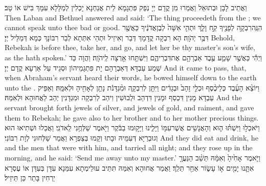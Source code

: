 {וַאֲתֵיב לָבָן וּבְתוּאֵל וַאֲמַרוּ מִן קֳדָם יְיָ נְפַק פִּתְגָמָא לֵית אֲנַחְנָא יָכְלִין לְמַלָּלָא עִמָּךְ בִּישׁ אוֹ טָב׃}
{Then Laban and Bethuel answered and said: ‘The thing proceedeth from the \lord; we cannot speak unto thee bad or good.}{}
{הִנֵּֽה\maqqaf רִבְקָ֥ה לְפָנֶ֖יךָ קַ֣ח וָלֵ֑ךְ וּתְהִ֤י אִשָּׁה֙ לְבֶן\maqqaf אֲדֹנֶ֔יךָ כַּאֲשֶׁ֖ר דִּבֶּ֥ר יְהֹוָֽה׃}
{הָא רִבְקָה קֳדָמָךְ דְּבַר וְאִיזֵיל וּתְהֵי אִתְּתָא לְבַר רִבּוֹנָךְ כְּמָא דְּמַלֵּיל יְיָ׃}
{Behold, Rebekah is before thee, take her, and go, and let her be thy master’s son’s wife, as the \lord\space hath spoken.’}{}
{וַיְהִ֕י כַּאֲשֶׁ֥ר שָׁמַ֛ע עֶ֥בֶד אַבְרָהָ֖ם אֶת\maqqaf דִּבְרֵיהֶ֑ם וַיִּשְׁתַּ֥חוּ אַ֖רְצָה לַֽיהֹוָֽה׃}
{וַהֲוָה כַּד שְׁמַע עַבְדָּא דְּאַבְרָהָם יָת פִּתְגָמֵיהוֹן וּסְגֵיד עַל אַרְעָא קֳדָם יְיָ׃}
{And it came to pass, that, when Abraham’s servant heard their words, he bowed himself down to the earth unto the \lord.}{}
{וַיּוֹצֵ֨א הָעֶ֜בֶד כְּלֵי\maqqaf כֶ֨סֶף וּכְלֵ֤י זָהָב֙ וּבְגָדִ֔ים וַיִּתֵּ֖ן לְרִבְקָ֑ה וּמִ֨גְדָּנֹ֔ת נָתַ֥ן לְאָחִ֖יהָ וּלְאִמָּֽהּ׃}
{וְאַפֵּיק עַבְדָּא מָנִין דִּכְסַף וּמָנִין דִּדְהַב וּלְבוּשִׁין וִיהַב לְרִבְקָה וּמִגְדָּנִין יְהַב לַאֲחוּהָא וּלְאִמַּהּ׃}
{And the servant brought forth jewels of silver, and jewels of gold, and raiment, and gave them to Rebekah; he gave also to her brother and to her mother precious things.}{}
{וַיֹּאכְל֣וּ וַיִּשְׁתּ֗וּ ה֛וּא וְהָאֲנָשִׁ֥ים אֲשֶׁר\maqqaf עִמּ֖וֹ וַיָּלִ֑ינוּ וַיָּק֣וּמוּ בַבֹּ֔קֶר וַיֹּ֖אמֶר שַׁלְּחֻ֥נִי לַֽאדֹנִֽי׃}
{וַאֲכַלוּ וּשְׁתִיאוּ הוּא וְגוּבְרַיָּא דְּעִמֵּיהּ וּבָתוּ וְקָמוּ בְּצַפְרָא וַאֲמַר שַׁלְּחוּנִי לְוָת רִבּוֹנִי׃}
{And they did eat and drink, he and the men that were with him, and tarried all night; and they rose up in the morning, and he said: ‘Send me away unto my master.’}{}
{וַיֹּ֤אמֶר אָחִ֙יהָ֙ וְאִמָּ֔הּ תֵּשֵׁ֨ב הַנַּעֲרָ֥ אִתָּ֛נוּ יָמִ֖ים א֣וֹ עָשׂ֑וֹר אַחַ֖ר תֵּלֵֽךְ׃}
{וַאֲמַר אֲחוּהָא וְאִמַּהּ תִּתֵּיב עוּלֵימְתָא עִמַּנָא עִדָּן בְּעִדָּן אוֹ עֶסְרָא יַרְחִין בָּתַר כֵּן תֵּיזֵיל׃}
